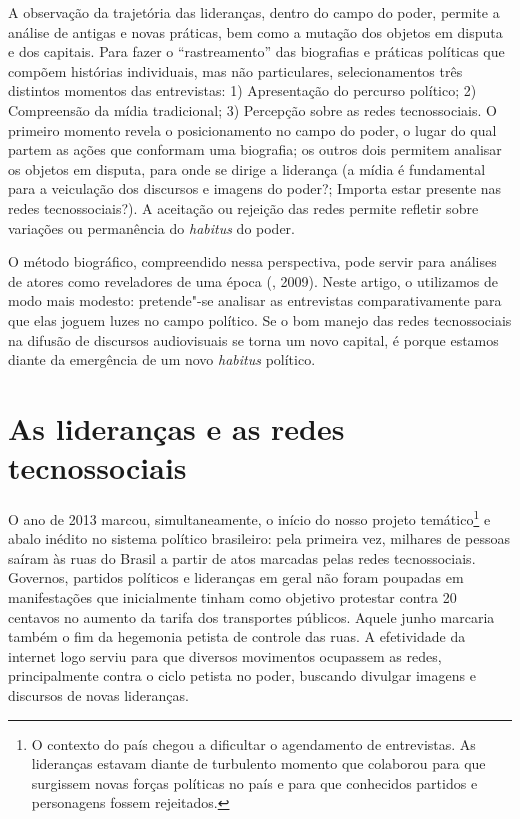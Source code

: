 A observação da trajetória das lideranças, dentro do campo do poder,
permite a análise de antigas e novas práticas, bem como a mutação dos
objetos em disputa e dos capitais. Para fazer o ``rastreamento'' das
biografias e práticas políticas que compõem histórias individuais, mas
não particulares, selecionamentos três distintos momentos das
entrevistas: 1) Apresentação do percurso político; 2) Compreensão da
mídia tradicional; 3) Percepção sobre as redes tecnossociais. O primeiro
momento revela o posicionamento no campo do poder, o lugar do qual
partem as ações que conformam uma biografia; os outros dois permitem
analisar os objetos em disputa, para onde se dirige a liderança (a mídia
é fundamental para a veiculação dos discursos e imagens do poder?;
Importa estar presente nas redes tecnossociais?). A aceitação ou
rejeição das redes permite refletir sobre variações ou permanência do
\emph{habitus} do poder.

O método biográfico, compreendido nessa perspectiva, pode servir para
análises de atores como reveladores de uma época (, 2009). Neste
artigo, o utilizamos de modo mais modesto: pretende"-se analisar as
entrevistas comparativamente para que elas joguem luzes no campo
político. Se o bom manejo das redes tecnossociais na difusão de
discursos audiovisuais se torna um novo capital, é porque estamos diante
da emergência de um novo \emph{habitus} político.

\section{As lideranças e as redes tecnossociais}

O ano de 2013 marcou, simultaneamente, o início do nosso projeto
temático\footnote{O contexto do país chegou a dificultar o agendamento
  de entrevistas. As lideranças estavam diante de turbulento momento que
  colaborou para que surgissem novas forças políticas no país e para que
  conhecidos partidos e personagens fossem rejeitados.} e abalo inédito
no sistema político brasileiro: pela primeira vez, milhares de pessoas
saíram às ruas do Brasil a partir de atos marcadas pelas redes
tecnossociais. Governos, partidos políticos e lideranças em geral não
foram poupadas em manifestações que inicialmente tinham como objetivo
protestar contra 20 centavos no aumento da tarifa dos transportes
públicos. Aquele junho marcaria também o fim da hegemonia petista de
controle das ruas. A efetividade da internet logo serviu para que
diversos movimentos ocupassem as redes, principalmente contra o ciclo
petista no poder, buscando divulgar imagens e discursos de novas
lideranças.

